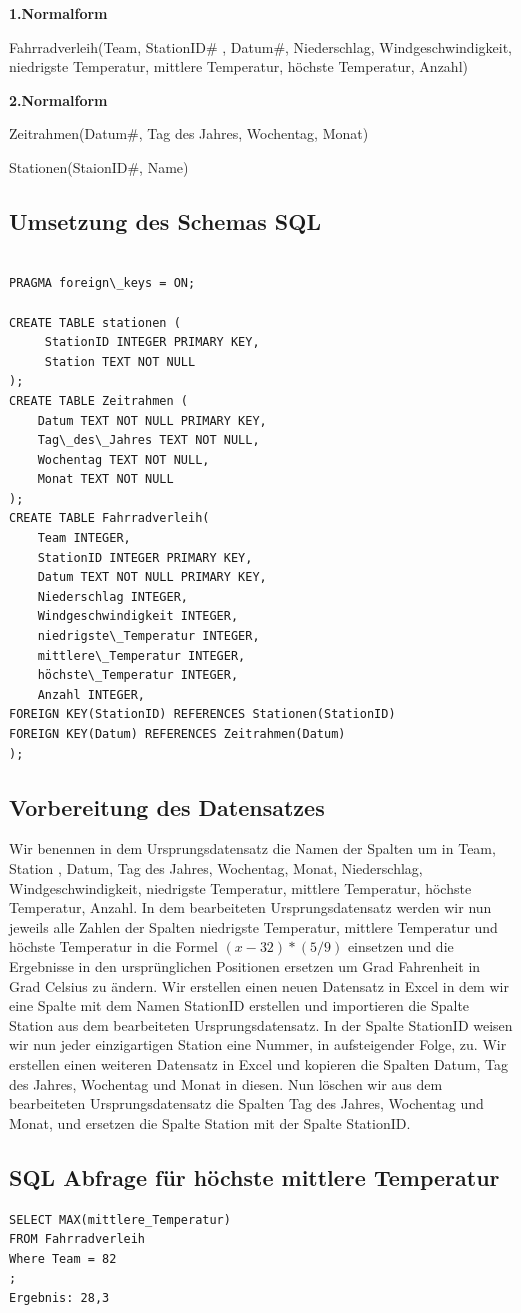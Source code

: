 \documentclass{article}
\begin{document}
\textbf{1.Normalform}

Fahrradverleih(Team, StationID\# , Datum\#, Niederschlag,
Windgeschwindigkeit, niedrigste Temperatur, mittlere Temperatur, höchste Temperatur, Anzahl)

\textbf{2.Normalform}

Zeitrahmen(Datum\#, Tag des Jahres, Wochentag, Monat)

Stationen(StaionID\#, Name)


\subsection{Umsetzung des Schemas SQL}

\begin{verbatim}
    
PRAGMA foreign\_keys = ON;

CREATE TABLE stationen (
     StationID INTEGER PRIMARY KEY,
     Station TEXT NOT NULL
);
CREATE TABLE Zeitrahmen (
    Datum TEXT NOT NULL PRIMARY KEY,
    Tag\_des\_Jahres TEXT NOT NULL,
    Wochentag TEXT NOT NULL,
    Monat TEXT NOT NULL
);
CREATE TABLE Fahrradverleih(
    Team INTEGER,
    StationID INTEGER PRIMARY KEY,
    Datum TEXT NOT NULL PRIMARY KEY,
    Niederschlag INTEGER,
    Windgeschwindigkeit INTEGER,
    niedrigste\_Temperatur INTEGER,
    mittlere\_Temperatur INTEGER,
    höchste\_Temperatur INTEGER,
    Anzahl INTEGER,
FOREIGN KEY(StationID) REFERENCES Stationen(StationID)
FOREIGN KEY(Datum) REFERENCES Zeitrahmen(Datum)
);
\end{verbatim}

\subsection{Vorbereitung des Datensatzes}
Wir benennen in dem Ursprungsdatensatz die Namen der Spalten um in Team, Station , Datum, Tag des Jahres, Wochentag, Monat, Niederschlag,
Windgeschwindigkeit, niedrigste Temperatur, mittlere Temperatur, höchste Temperatur, Anzahl. In dem bearbeiteten Ursprungsdatensatz werden wir nun jeweils alle Zahlen der Spalten niedrigste Temperatur, mittlere Temperatur und höchste Temperatur in die Formel $(x-32)*(5/9)$ einsetzen und die Ergebnisse in den ursprünglichen Positionen ersetzen um Grad Fahrenheit in Grad Celsius zu ändern. Wir erstellen einen neuen Datensatz in Excel in dem wir eine Spalte mit dem Namen StationID erstellen und importieren die Spalte Station aus dem bearbeiteten Ursprungsdatensatz. In der Spalte StationID weisen wir nun jeder einzigartigen Station eine Nummer, in aufsteigender Folge, zu. Wir erstellen einen weiteren Datensatz in Excel und kopieren die Spalten Datum, Tag des Jahres, Wochentag und Monat in diesen.
Nun löschen wir aus dem bearbeiteten Ursprungsdatensatz die Spalten Tag des Jahres, Wochentag und Monat, und ersetzen die Spalte Station mit der Spalte StationID.

\subsection{SQL Abfrage für höchste mittlere Temperatur}
\begin{verbatim}
SELECT MAX(mittlere_Temperatur)
FROM Fahrradverleih
Where Team = 82
;
Ergebnis: 28,3
\end{verbatim}


\newpage



\end{document}
